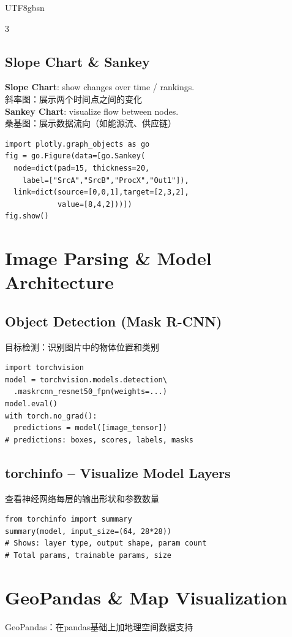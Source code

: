 \documentclass[9pt,landscape,a4paper]{article}
\newcommand{\zhint}[1]{{\scriptsize\color{gray!70!black}#1}}
\begin{document}
\begin{CJK}{UTF8}{gbsn}
\begin{multicols}{3}
\subsection{Slope Chart \& Sankey}
\textbf{Slope Chart}: show changes over time / rankings.\\
\zhint{斜率图：展示两个时间点之间的变化}\\
\textbf{Sankey Chart}: visualize flow between nodes.\\
\zhint{桑基图：展示数据流向（如能源流、供应链）}
\begin{lstlisting}
import plotly.graph_objects as go
fig = go.Figure(data=[go.Sankey(
  node=dict(pad=15, thickness=20,
    label=["SrcA","SrcB","ProcX","Out1"]),
  link=dict(source=[0,0,1],target=[2,3,2],
            value=[8,4,2]))])
fig.show()
\end{lstlisting}

\section{Image Parsing \& Model Architecture}

\subsection{Object Detection (Mask R-CNN)}
\zhint{目标检测：识别图片中的物体位置和类别}
\begin{lstlisting}
import torchvision
model = torchvision.models.detection\
  .maskrcnn_resnet50_fpn(weights=...)
model.eval()
with torch.no_grad():
  predictions = model([image_tensor])
# predictions: boxes, scores, labels, masks
\end{lstlisting}

\subsection{torchinfo -- Visualize Model Layers}
\zhint{查看神经网络每层的输出形状和参数数量}
\begin{lstlisting}
from torchinfo import summary
summary(model, input_size=(64, 28*28))
# Shows: layer type, output shape, param count
# Total params, trainable params, size
\end{lstlisting}

\section{GeoPandas \& Map Visualization}
\zhint{GeoPandas：在pandas基础上加地理空间数据支持}


\end{multicols}
\end{CJK}
\end{document}
